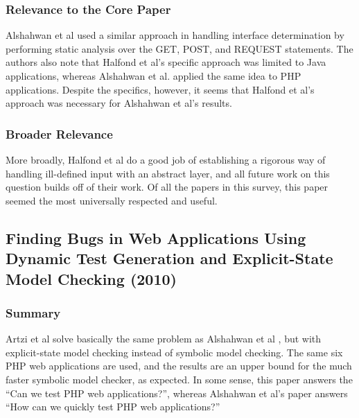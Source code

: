 \documentclass{sig-alternate-05-2015}
\begin{document}
\subsubsection{Relevance to the Core Paper}
Alshahwan et al \cite{alshahwan2011automated} used a similar approach in handling interface determination by performing static analysis over the GET, POST, and REQUEST statements. The authors also note that Halfond et al's specific approach was limited to Java applications, whereas Alshahwan et al. applied the same idea to PHP applications. Despite the specifics, however, it seems that Halfond et al's approach was necessary for Alshahwan et al's results. 

\subsubsection{Broader Relevance}
More broadly, Halfond et al do a good job of establishing a rigorous way of handling ill-defined input with an abstract layer, and all future work on this question builds off of their work. Of all the papers in this survey, this paper seemed the most universally respected and useful. 


\subsection{Finding Bugs in Web Applications Using Dynamic Test Generation and Explicit-State Model Checking (2010)}

\subsubsection{Summary}
Artzi et al \cite{artzi2010finding} solve basically the same problem as Alshahwan et al \cite{alshahwan2011automated}, but with explicit-state model checking instead of symbolic model checking. The same six PHP web applications are used, and the results are an upper bound for the much faster symbolic model checker, as expected. In some sense, this paper answers the ``Can we test PHP web applications?'', whereas Alshahwan et al's paper answers ``How can we quickly test PHP web applications?''
\end{document}
